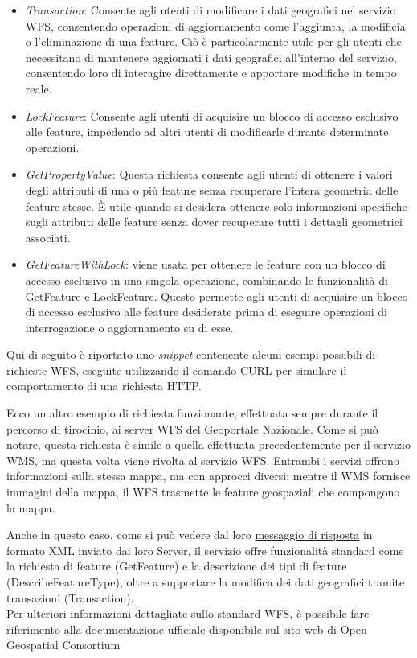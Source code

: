 \begin{itemize}
      \item \textit{Transaction}: Consente agli utenti di modificare i dati geografici nel servizio WFS, consentendo operazioni di aggiornamento come l'aggiunta, la modificia o l'eliminazione di una feature. Ciò è particolarmente utile per gli utenti che necessitano di mantenere aggiornati i dati geografici all'interno del servizio, consentendo loro di interagire direttamente e apportare modifiche in tempo reale.
      \item \textit{LockFeature}: Consente agli utenti di acquisire un blocco di accesso esclusivo alle feature, impedendo ad altri utenti di modificarle durante determinate operazioni.
      \item \textit{GetPropertyValue}: Questa richiesta consente agli utenti di ottenere i valori degli attributi di una o più feature senza recuperare l'intera geometria delle feature stesse. È utile quando si desidera ottenere solo informazioni specifiche sugli attributi delle feature senza dover recuperare tutti i dettagli geometrici associati.
      \item \textit{GetFeatureWithLock}: viene usata per ottenere le feature con un blocco di accesso esclusivo in una singola operazione, combinando le funzionalità di GetFeature e LockFeature. Questo permette agli utenti di acquisire un blocco di accesso esclusivo alle feature desiderate prima di eseguire operazioni di interrogazione o aggiornamento su di esse.
\end{itemize}
Qui di seguito è riportato uno \textit{snippet} contenente alcuni esempi possibili di richieste WFS, eseguite utilizzando il comando CURL per simulare il comportamento di una richiesta HTTP.

\lstset{basicstyle=\footnotesize\ttfamily}

Ecco un altro esempio di richiesta funzionante, effettuata sempre durante il percorso di tirocinio, ai server WFS del Geoportale Nazionale.
Come si può notare, questa richiesta è simile a quella effettuata precedentemente per il servizio WMS, ma questa volta viene rivolta al servizio WFS. Entrambi i servizi offrono informazioni sulla stessa mappa, ma con approcci diversi: mentre il WMS fornisce immagini della mappa, il WFS trasmette le feature geospaziali che compongono la mappa.

\lstset{basicstyle=\footnotesize\ttfamily}

Anche in questo caso, come si può vedere dal loro \href{http://wms.pcn.minambiente.it/ogc?map=/ms_ogc/wfs/Alluvioni_Estensione.map&service=wfs&request=getCapabilities}{messaggio di risposta} in formato XML inviato dai loro Server,
il servizio offre funzionalità standard come la richiesta di feature (GetFeature) e la descrizione dei tipi di feature (DescribeFeatureType), oltre a supportare la modifica dei dati geografici tramite transazioni (Transaction).
\\Per ulteriori informazioni dettagliate sullo standard WFS, è possibile fare riferimento alla documentazione ufficiale disponibile sul sito web di Open Geospatial Consortium \cite{DocumentazioneWMS}

